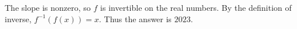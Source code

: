 The slope is nonzero, so $f$ is invertible on the real numbers. By the definition of inverse, $f^{-1}(f(x))=x$. Thus the answer is $\boxed{2023}$.
